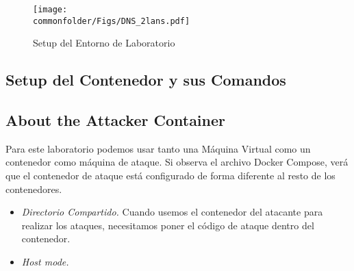 \begin{figure}[htb]
\centering
\texttt{[image: \\commonfolder/Figs/DNS\_2lans.pdf]}
\caption{Setup del Entorno de Laboratorio}
\label{dns:fig:environment}
\end{figure}



\subsection{Setup del Contenedor y sus Comandos}






\subsection{About the Attacker Container} 

Para este laboratorio podemos usar tanto una Máquina Virtual como un contenedor como máquina de ataque. Si observa el archivo Docker Compose, verá que el contenedor de ataque está configurado de forma diferente al resto de los contenedores.


\begin{itemize}
\item \textit{Directorio Compartido.} Cuando usemos el contenedor del atacante para realizar los ataques, necesitamos poner el código de ataque dentro del contenedor.



\item \textit{Host mode.} 

\end{itemize}








